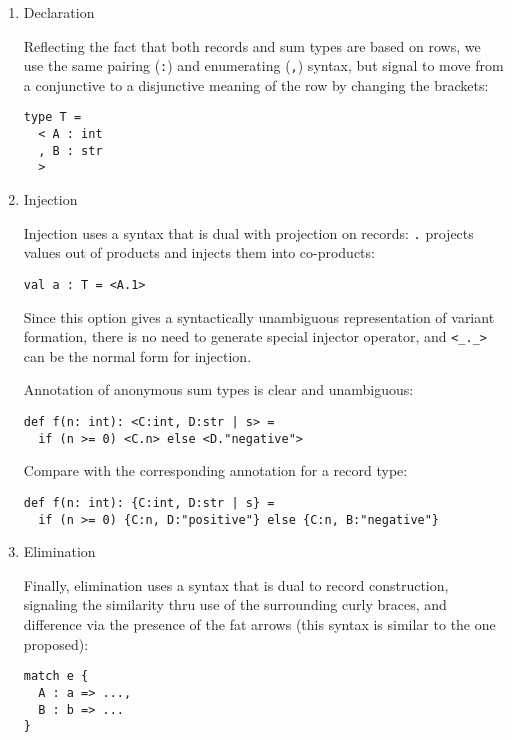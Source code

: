 \documentclass[11pt]{article}
\begin{document}
\begin{enumerate}
\item Declaration
\label{sec:org57bb208}

Reflecting the fact that both records and sum types are based on rows, we
use the same pairing (\texttt{:}) and enumerating (\texttt{,}) syntax, but signal to move from
a conjunctive to a disjunctive meaning of the row by changing the brackets:

\begin{verbatim}
type T =
  < A : int
  , B : str
  >
\end{verbatim}

\item Injection
\label{sec:orgc36a815}

Injection uses a syntax that is dual with projection on records: \texttt{.} projects
values out of products and injects them into co-products:

\begin{verbatim}
val a : T = <A.1>
\end{verbatim}

Since this option gives a syntactically unambiguous representation of
variant formation, there is no need to generate special injector operator, and
\texttt{<\_.\_>} can be the normal form for injection.

Annotation of anonymous sum types is clear and unambiguous:

\begin{verbatim}
def f(n: int): <C:int, D:str | s> =
  if (n >= 0) <C.n> else <D."negative">
\end{verbatim}

Compare with the corresponding annotation for a record type:

\begin{verbatim}
def f(n: int): {C:int, D:str | s} =
  if (n >= 0) {C:n, D:"positive"} else {C:n, B:"negative"}
\end{verbatim}

\item Elimination
\label{sec:org18b634b}

Finally, elimination uses a syntax that is dual to record construction,
signaling the similarity thru use of the surrounding curly braces, and
difference via the presence of the fat arrows (this syntax is similar to the
one proposed):

\begin{verbatim}
match e {
  A : a => ...,
  B : b => ...
}
\end{verbatim}
\end{enumerate}
\end{document}
